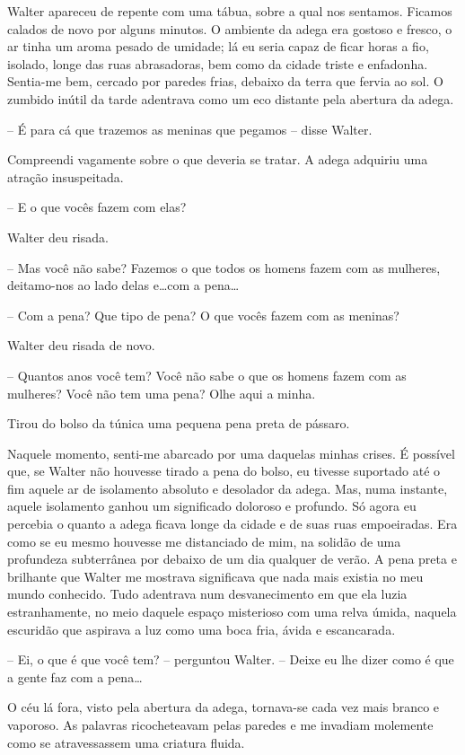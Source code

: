 Walter apareceu de repente com uma tábua, sobre a qual nos sentamos. Ficamos calados de novo por alguns minutos. O ambiente da adega era gostoso e fresco, o ar tinha um aroma pesado de umidade; lá eu seria capaz de ficar horas a fio, isolado, longe das ruas abrasadoras, bem como da cidade triste e enfadonha. Sentia-me bem, cercado por paredes frias, debaixo da terra que fervia ao sol. O zumbido inútil da tarde adentrava como um eco distante pela abertura da adega.

-- É para cá que trazemos as meninas que pegamos -- disse Walter.

Compreendi vagamente sobre o que deveria se tratar. A adega adquiriu uma atração insuspeitada.

-- E o que vocês fazem com elas?

Walter deu risada.

-- Mas você não sabe? Fazemos o que todos os homens fazem com as mulheres, deitamo-nos ao lado delas e\dots com a pena\dots

-- Com a pena? Que tipo de pena? O que vocês fazem com as meninas?

Walter deu risada de novo.

-- Quantos anos você tem? Você não sabe o que os homens fazem com as mulheres? Você não tem uma pena? Olhe aqui a minha.

Tirou do bolso da túnica uma pequena pena preta de pássaro.

Naquele momento, senti-me abarcado por uma daquelas minhas crises. É possível que, se Walter não houvesse tirado a pena do bolso, eu tivesse suportado até o fim aquele ar de isolamento absoluto e desolador da adega. Mas, numa instante, aquele isolamento ganhou um significado doloroso e profundo. Só agora eu percebia o quanto a adega ficava longe da cidade e de suas ruas empoeiradas. Era como se eu mesmo houvesse me distanciado de mim, na solidão de uma profundeza subterrânea por debaixo de um dia qualquer de verão. A pena preta e brilhante que Walter me mostrava significava que nada mais existia no meu mundo conhecido. Tudo adentrava num desvanecimento em que ela luzia estranhamente, no meio daquele espaço misterioso com uma relva úmida, naquela escuridão que aspirava a luz como uma boca fria, ávida e escancarada.

-- Ei, o que é que você tem? -- perguntou Walter. -- Deixe eu lhe dizer como é que a gente faz com a pena\dots

O céu lá fora, visto pela abertura da adega, tornava-se cada vez mais branco e vaporoso. As palavras ricocheteavam pelas paredes e me invadiam molemente como se atravessassem uma criatura fluida.

